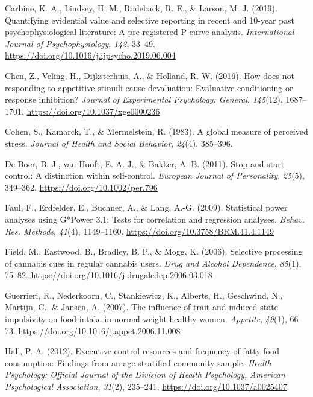 \documentclass[man,floatsintext]{apa6}
\begin{document}
\leavevmode\hypertarget{ref-carbine_quantifying_2019}{}%
Carbine, K. A., Lindsey, H. M., Rodeback, R. E., \& Larson, M. J. (2019). Quantifying evidential value and selective reporting in recent and 10-year past psychophysiological literature: A pre-registered P-curve analysis. \emph{International Journal of Psychophysiology}, \emph{142}, 33--49. \url{https://doi.org/10.1016/j.ijpsycho.2019.06.004}

\leavevmode\hypertarget{ref-chen_how_2016}{}%
Chen, Z., Veling, H., Dijksterhuis, A., \& Holland, R. W. (2016). How does not responding to appetitive stimuli cause devaluation: Evaluative conditioning or response inhibition? \emph{Journal of Experimental Psychology: General}, \emph{145}(12), 1687--1701. \url{https://doi.org/10.1037/xge0000236}

\leavevmode\hypertarget{ref-cohen_global_1983}{}%
Cohen, S., Kamarck, T., \& Mermelstein, R. (1983). A global measure of perceived stress. \emph{Journal of Health and Social Behavior}, \emph{24}(4), 385--396.

\leavevmode\hypertarget{ref-de_boer_stop_2011}{}%
De Boer, B. J., van Hooft, E. A. J., \& Bakker, A. B. (2011). Stop and start control: A distinction within self-control. \emph{European Journal of Personality}, \emph{25}(5), 349--362. \url{https://doi.org/10.1002/per.796}

\leavevmode\hypertarget{ref-faul_statistical_2009}{}%
Faul, F., Erdfelder, E., Buchner, A., \& Lang, A.-G. (2009). Statistical power analyses using G*Power 3.1: Tests for correlation and regression analyses. \emph{Behav. Res. Methods}, \emph{41}(4), 1149--1160. \url{https://doi.org/10.3758/BRM.41.4.1149}

\leavevmode\hypertarget{ref-field_selective_2006}{}%
Field, M., Eastwood, B., Bradley, B. P., \& Mogg, K. (2006). Selective processing of cannabis cues in regular cannabis users. \emph{Drug and Alcohol Dependence}, \emph{85}(1), 75--82. \url{https://doi.org/10.1016/j.drugalcdep.2006.03.018}

\leavevmode\hypertarget{ref-guerrieri_influence_2007}{}%
Guerrieri, R., Nederkoorn, C., Stankiewicz, K., Alberts, H., Geschwind, N., Martijn, C., \& Jansen, A. (2007). The influence of trait and induced state impulsivity on food intake in normal-weight healthy women. \emph{Appetite}, \emph{49}(1), 66--73. \url{https://doi.org/10.1016/j.appet.2006.11.008}

\leavevmode\hypertarget{ref-hall_executive_2012}{}%
Hall, P. A. (2012). Executive control resources and frequency of fatty food consumption: Findings from an age-stratified community sample. \emph{Health Psychology: Official Journal of the Division of Health Psychology, American Psychological Association}, \emph{31}(2), 235--241. \url{https://doi.org/10.1037/a0025407}
\end{document}
